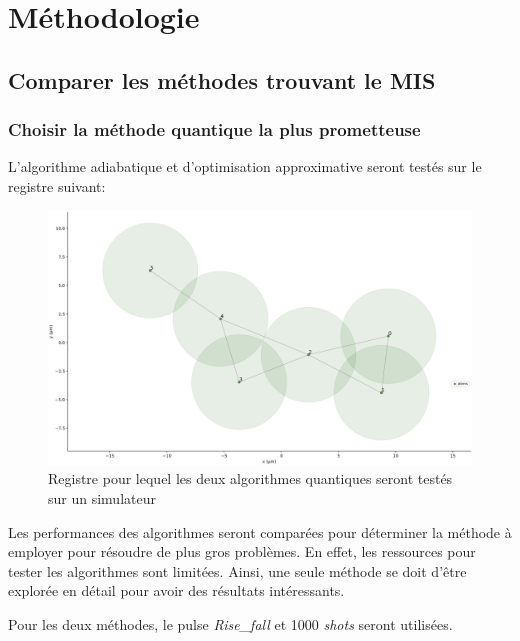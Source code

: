 \documentclass[11pt]{article}
\begin{document}
\section{Méthodologie}

\subsection{Comparer les méthodes trouvant le MIS}
\subsubsection{Choisir la méthode quantique la plus prometteuse}
L'algorithme adiabatique et d'optimisation approximative seront testés sur le registre suivant: 

\begin{figure}[H]
    \centering
    \includegraphics[width = 0.48\linewidth]{images/registre_exemple.png}
    \caption{Registre pour lequel les deux algorithmes quantiques seront testés sur un simulateur}
\end{figure}\label{graphtocompare}

Les performances des algorithmes seront comparées pour déterminer la méthode à employer pour résoudre de plus gros problèmes. En effet, les ressources pour tester les algorithmes sont limitées. Ainsi, une seule méthode se doit d'être explorée en détail pour avoir des résultats intéressants.

Pour les deux méthodes, le pulse \textit{Rise\_fall} et 1000 \textit{shots} seront utilisées.
\end{document}
